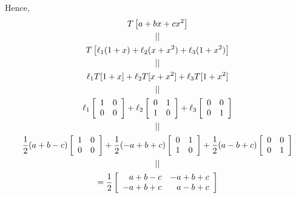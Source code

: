 \documentclass[pdf,9pt]{beamer}
\begin{document}
\begin{frame}[fragile]
\begin{solution}
   Hence,
   \begin{gather*}
T\left[a+bx+cx^2\right] \\ || \\
T\left[\ell_1(1+x)+\ell_2(x+x^2)+\ell_{3}(1+x^2)\right] \\ || \\
\ell_1T[1+x]+\ell_2T[ x+x^2 ]+\ell_{3}T[1+x^2]\\ || \\
\ell_1\left[ \begin{array}{rr}
  1 & 0 \\
  0 & 0
\end{array} \right] + \ell_2\left[ \begin{array}{rr}
  0 & 1 \\
  1 & 0
\end{array} \right] + \ell_3\left[ \begin{array}{rr}
  0 & 0 \\
  0 & 1
\end{array} \right] \\||\\
\frac{1}{2}(a + b - c)\left[ \begin{array}{rr}
  1 & 0 \\
  0 & 0
\end{array} \right] + \frac{1}{2}(-a + b + c)\left[ \begin{array}{rr}
  0 & 1 \\
  1 & 0
\end{array} \right] + \frac{1}{2}(a - b + c)\left[ \begin{array}{rr}
  0 & 0 \\
  0 & 1
\end{array} \right] \\||\\
= \frac{1}{2} \left[ \begin{array}{rr}
  a + b - c  & -a + b + c \\
  -a + b + c & a - b + c
\end{array} \right]
\end{gather*}
\myQED
\end{solution}
\end{frame}
\end{document}
